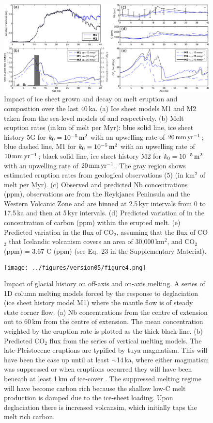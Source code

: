 \documentclass[draft,linenumbers]{agujournal2018}
\begin{document}
\begin{figure}
\includegraphics[width=14cm]{../figures/version05/figure3.png}
\caption{Impact of ice sheet grown and decay on melt eruption and composition over the last 40\,ka. (a) Ice sheet models M1 and M2 taken from the sea-level models of \citet{peltier-2004} and \citet{pico-etal-2017} respectively. (b) Melt eruption rates (in\,km of melt per Myr): blue solid line, ice sheet history 5G for $k_{0} = 10^{-5}\rm\,m^{2}$ with an upwelling rate of $20\rm\,mm\,yr^{-1}$; blue dashed line, M1 for $k_{0} = 10^{-5}\rm\,m^{2}$ with an upwelling rate of $10\rm\,mm\,yr^{-1}$; black solid line, ice sheet history M2 for $k_{0} = 10^{-5}\rm\,m^{2}$ with an upwelling rate of $20\rm\,mm\,yr^{-1}$. The gray region shows estimated eruption rates from geological observations (5) (in km$^2$ of melt per Myr). (c) Observed and predicted Nb concentrations (ppm), observations are from the Reykjanes Peninsula and the Western Volcanic Zone \citep{gee-etal-1998,sinton-etal-2005,eason-etal-2015} and are binned at 2.5\,kyr intervals from 0 to 17.5\,ka and then at 5\,kyr intervals. (d) Predicted variation of in the concentration of carbon (ppm) within the erupted melt. (e) Predicted variation in the flux of CO$_{2}$, assuming that the flux of CO$_{2}$ that Icelandic volcanism covers an area of 30,000\,km$^{2}$, and CO$_{2}$ (ppm) = 3.67 C (ppm) (see Eq.~23 in the Supplementary Material).}
\label{fg:5}
\end{figure}

\begin{figure}
\texttt{[image: ../figures/version05/figure4.png]}
\caption{Impact of glacial history on off-axis and on-axis melting. A series of 1D column melting models forced by the response to deglaciation (ice sheet history model M1) where the mantle flow is of steady state corner flow. (a) Nb concentrations from the centre of extension out to 60\,km from the centre of extension. The mean concentration weighted by the eruption rate is plotted as the thick black line. (b) Predicted CO$_{2}$ flux from the series of vertical melting models. The late-Pleistocene eruptions are typified by tuya magmatism. This will have been the case up until at least $\sim$14\,ka, where either magmatism was suppressed or when eruptions occurred they will have been beneath at least 1\,km of ice-cover \citep{hartley-etal-2016}. The suppressed melting regime will have become carbon rich because the shallow low-C melt production is damped due to the ice-sheet loading. Upon deglaciation there is increased volcansim, which initially taps the melt rich carbon.}
\label{fg:6}
\end{figure}
\end{document}
